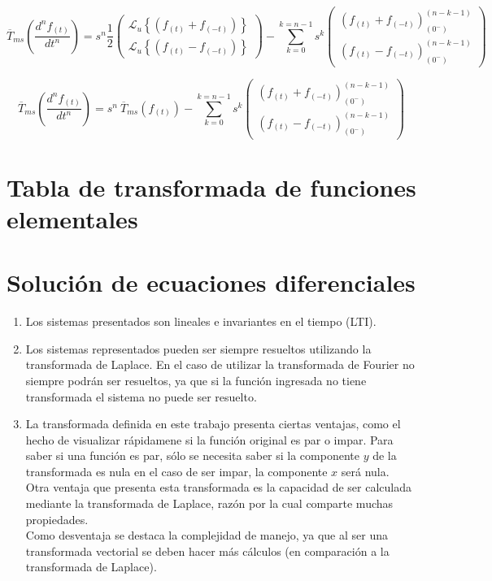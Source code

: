 \documentclass[12pt]{article}
\begin{document}
$$\overline{T}_{ms}\left(\frac{d^n f_{(t)}}{dt^n}\right) =s^n \frac12
\begin{pmatrix}
\mathcal{L}_u\left\{(f_{(t)} + f_{(-t)})\right\} \\[0.5 cm]
\mathcal{L}_u\left\{(f_{(t)} - f_{(-t)})\right\} 
\end{pmatrix}
- \sum\limits_{k=0}^{k=n-1} s^k
\begin{pmatrix}
 (f_{(t)} + f_{(-t)})^{(n-k-1)}_{(0^-)}\\[0.5 cm]
 (f_{(t)} - f_{(-t)})^{(n-k-1)}_{(0^-)}
\end{pmatrix}
$$

$$\overline{T}_{ms}\left(\frac{d^n f_{(t)}}{dt^n}\right) =s^n\  \overline{T}_{ms}(f_{(t)})
- \sum\limits_{k=0}^{k=n-1} s^k
\begin{pmatrix}
 (f_{(t)} + f_{(-t)})^{(n-k-1)}_{(0^-)}\\[0.5 cm]
 (f_{(t)} - f_{(-t)})^{(n-k-1)}_{(0^-)}
\end{pmatrix}
$$

\section{Tabla de transformada de funciones elementales}

\section{Solución de ecuaciones diferenciales}
\begin{enumerate}[label=(\alph*)]
\item Los sistemas presentados son lineales e invariantes en el tiempo (LTI).
\item Los sistemas representados pueden ser siempre resueltos utilizando la transformada de Laplace. En el caso de utilizar la transformada de Fourier no siempre podrán ser resueltos, ya que si la función ingresada no tiene transformada el sistema no puede ser resuelto.
\item La transformada definida en este trabajo presenta ciertas ventajas, como el  hecho de visualizar rápidamene si la función original es par o impar. Para saber si una función es par, sólo se necesita saber si la componente $y$ de la transformada es nula en el caso de ser impar, la componente $x$ será nula. Otra ventaja que presenta esta transformada es la capacidad de ser calculada mediante la transformada de Laplace, razón por la cual comparte muchas propiedades.\\

Como desventaja se destaca la complejidad de manejo, ya que al ser una transformada vectorial se deben hacer más cálculos  (en comparación a la transformada de Laplace).
\end{enumerate}
\end{document}
